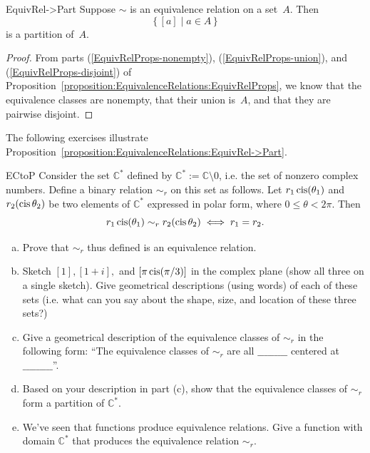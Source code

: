 \begin{prop}{EquivRel->Part}
Suppose $\sim$ is an equivalence relation on a set~$A$. Then 
	$$ \{\, [a] \mid a \in A \,\} $$
is a partition of~$A$.
\end{prop}

\begin{proof}
From parts (\ref{EquivRelProps-nonempty}), (\ref{EquivRelProps-union}), and (\ref{EquivRelProps-disjoint}) of Proposition~\ref{proposition:EquivalenceRelations:EquivRelProps}, we know that the equivalence classes are nonempty, that their union is~$A$, and that they are pairwise disjoint.
\end{proof}

The following exercises illustrate Proposition~\ref{proposition:EquivalenceRelations:EquivRel->Part}.

\begin{exercise}{ECtoP}
Consider the set $\mathbb{C}^*$ defined by $\mathbb{C}^* := \mathbb{C} \setminus 0$, i.e. the set of nonzero complex numbers. Define a binary relation $\sim_r$ on this set as follows.  Let $ r_1 \operatorname{cis}(\theta_1)$ and $r_2(\operatorname{cis} \theta_2)$  be two elements of $\mathbb{C}^*$ expressed in polar form, where $0 \le \theta < 2\pi$. Then
\[ r_1 \operatorname{cis}(\theta_1) \sim_r r_2(\operatorname{cis} \theta_2)  \iff r_1 = r_2.\]

\begin{enumerate}[(a)]
\item
Prove that $\sim_r$ thus defined is an equivalence relation.
\item
Sketch $[1], [1+i],$  and $[\pi \operatorname{cis}(\pi/3)]$ in the complex plane (show all three on a single sketch). Give geometrical descriptions (using words) of each of these sets (i.e. what can you say about the shape, size, and location of these three sets?)
\item 
Give a geometrical description of the equivalence classes of $\sim_r$ in the following form:  ``The equivalence classes of $\sim_r$ are all $\_\_\_\_\_\_\_\_\_$ centered at $\_\_\_\_\_\_\_\_\_$''.
\item
Based on your description in part (c), show that the equivalence classes of $\sim_r$ form a partition of $\mathbb{C}^*$.
\item
We've seen that functions produce equivalence relations.  Give a function with domain $\mathbb{C}^*$ that produces the equivalence relation $\sim_r$. 
\end{enumerate}
\end{exercise}

